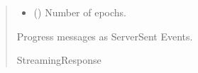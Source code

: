 \documentclass[letterpaper,10pt,english]{sphinxmanual}
\begin{document}
\begin{fulllineitems}
\begin{quote}
\begin{description}
\begin{itemize}
\item {} 
\sphinxAtStartPar
{} (\sphinxstyleliteralemphasis{\sphinxupquote{, }}) \textendash{} Number of epochs.

\end{itemize}

\sphinxAtStartPar
Progress messages as Server\sphinxhyphen{}Sent Events.

\sphinxAtStartPar
StreamingResponse

\end{description}\end{quote}

\end{fulllineitems}

\end{document}
